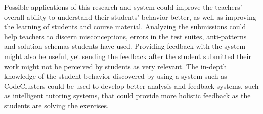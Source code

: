 Possible applications of this research and system could improve the teachers' overall ability to understand their students' behavior better, as well as improving the learning of students and course material. Analyzing the submissions could help teachers to discern misconceptions, errors in the test suites, anti-patterns and solution schemas students have used. Providing feedback with the system might also be useful, yet sending the feedback after the student submitted their work might not be perceived by students as very relevant. The in-depth knowledge of the student behavior discovered by using a system such as CodeClusters could be used to develop better analysis and feedback systems, such as intelligent tutoring systems, that could provide more holistic feedback as the students are solving the exercises.

\iffalse
The long-term benefits from analyzing the student submissions on a high abstraction level could provide teachers with a more realistic intuition how the exercises are being solved. Combining the system with for example snap-shot based solution progress analysis could allow teachers to precisely find and understand how students flail in the exercises. solve the exercises?
\fi
